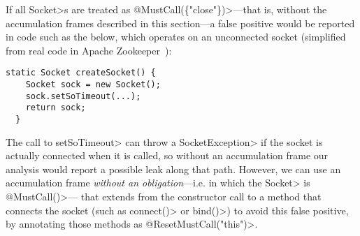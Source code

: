 If all \<Socket>s are treated as \<@MustCall(\{"close"\})>---that is,
without the accumulation frames described in this section---a false positive
would be reported
in code such as the below, which operates on an unconnected socket
(simplified from real code in Apache Zookeeper~):

\begin{lstlisting}[frame=tb,belowskip=3mm]
  static Socket createSocket() {
    Socket sock = new Socket();
    sock.setSoTimeout(...);
    return sock;
  }
\end{lstlisting}

The call to \<setSoTimeout> can throw a \<SocketException> if the
socket is actually connected when it is called, so without an
accumulation frame our analysis would report a possible leak along
that path.  However, we can use an accumulation frame \emph{without an
  obligation}---i.e. in which the \<Socket> is \<@MustCall({})>---
that extends from the constructor call to a method that connects the
socket (such as \<connect()> or \<bind()>) to avoid this false
positive, by annotating those methods as \<@ResetMustCall("this")>.
